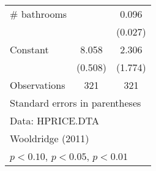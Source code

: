 \begin{table}[htbp]
\begin{tabular}{l*{2}{c}}
\addlinespace
# bathrooms         &                     &       0.096\sym{***}\\
                    &                     &     (0.027)         \\
\addlinespace
Constant            &       8.058\sym{***}&       2.306         \\
                    &     (0.508)         &     (1.774)         \\
\midrule
Observations        &         321         &         321         \\
\bottomrule
\multicolumn{3}{l}{\footnotesize Standard errors in parentheses}\\
\multicolumn{3}{l}{\footnotesize Data: HPRICE.DTA}\\
\multicolumn{3}{l}{\footnotesize Wooldridge (2011)}\\
\multicolumn{3}{l}{\footnotesize \sym{*} \(p<0.10\), \sym{**} \(p<0.05\), \sym{***} \(p<0.01\)}\\
\end{tabular}
\end{table}
